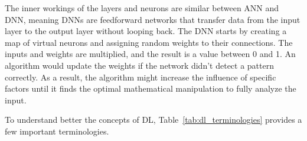 The inner workings of the layers and neurons are similar between \gls{ANN} and \gls{DNN}, meaning \gls{DNN}s are feedforward networks that transfer data from the input layer to the output layer without looping back. The \gls{DNN} starts by creating a map of virtual neurons and assigning random weights to their connections. The inputs and weights are multiplied, and the result is a value between 0 and 1. An algorithm would update the weights if the network didn't detect a pattern correctly. As a result, the algorithm might increase the influence of specific factors until it finds the optimal mathematical manipulation to fully analyze the input.

To understand better the concepts of \gls{DL}, Table~\ref{tab:dl_terminologies} provides a few important terminologies.


